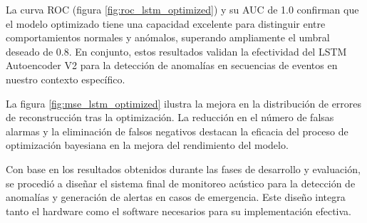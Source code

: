       La curva ROC (figura \ref{fig:roc_lstm_optimized}) y su AUC de 1.0 confirman que el modelo optimizado tiene una capacidad excelente para distinguir entre comportamientos normales y anómalos, superando ampliamente el umbral deseado de 0.8. En conjunto, estos resultados validan la efectividad del LSTM Autoencoder V2 para la detección de anomalías en secuencias de eventos en nuestro contexto específico.

      La figura \ref{fig:mse_lstm_optimized} ilustra la mejora en la distribución de errores de reconstrucción tras la optimización. La reducción en el número de falsas alarmas y la eliminación de falsos negativos destacan la eficacia del proceso de optimización bayesiana en la mejora del rendimiento del modelo.


Con base en los resultados obtenidos durante las fases de desarrollo y evaluación, se procedió a diseñar el sistema final de monitoreo acústico para la detección de anomalías y generación de alertas en casos de emergencia. Este diseño integra tanto el hardware como el software necesarios para su implementación efectiva.

